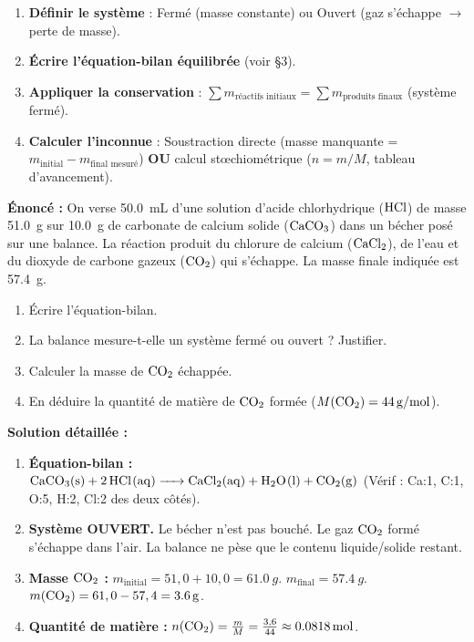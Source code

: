 \documentclass[11pt]{article}
\begin{document}
\begin{methode}
\begin{enumerate}
    \item \textbf{Définir le système} : Fermé (masse constante) ou Ouvert (gaz s'échappe $\rightarrow$ perte de masse).
    \item \textbf{Écrire l'équation-bilan équilibrée} (voir §3).
    \item \textbf{Appliquer la conservation} : $\sum m_{\text{réactifs initiaux}} = \sum m_{\text{produits finaux}}$ (système fermé).
    \item \textbf{Calculer l'inconnue} : Soustraction directe (masse manquante = $m_{\text{initial}} - m_{\text{final mesuré}}$) \textbf{OU} calcul stœchiométrique ($n = m/M$, tableau d'avancement).
\end{enumerate}
\end{methode}

\begin{exoresolu}
\textbf{Énoncé :} On verse \SI{50,0}{mL} d'une solution d'acide chlorhydrique ($\ce{HCl}$) de masse \SI{51,0}{g} sur \SI{10,0}{g} de carbonate de calcium solide ($\ce{CaCO3}$) dans un bécher posé sur une balance. La réaction produit du chlorure de calcium ($\ce{CaCl2}$), de l'eau et du dioxyde de carbone gazeux ($\ce{CO2}$) qui s'échappe. La masse finale indiquée est \SI{57,4}{g}.
\begin{enumerate}
    \item Écrire l'équation-bilan.
    \item La balance mesure-t-elle un système fermé ou ouvert ? Justifier.
    \item Calculer la masse de $\ce{CO2}$ échappée.
    \item En déduire la quantité de matière de $\ce{CO2}$ formée ($M(\ce{CO2})=\SI{44}{g/mol}$).
\end{enumerate}
\tcblower
\textbf{Solution détaillée :}
\begin{enumerate}
    \item \textbf{Équation-bilan :} $\ce{CaCO3(s) + 2 HCl(aq) -> CaCl2(aq) + H2O(l) + CO2(g)}$
    (Vérif : Ca:1, C:1, O:5, H:2, Cl:2 des deux côtés).
    \item \textbf{Système OUVERT.} Le bécher n'est pas bouché. Le gaz $\ce{CO2}$ formé s'échappe dans l'air. La balance ne pèse que le contenu liquide/solide restant.
    \item \textbf{Masse $\ce{CO2}$ :} $m_{\text{initial}} = 51,0 + 10,0 = \SI{61,0}{g}$. $m_{\text{final}} = \SI{57,4}{g}$.
    $m(\ce{CO2}) = 61,0 - 57,4 = \SI{3,6}{g}$.
    \item \textbf{Quantité de matière :} $n(\ce{CO2}) = \frac{m}{M} = \frac{3,6}{44} \approx \SI{0,0818}{mol}$.
\end{enumerate}
\end{exoresolu}
\end{document}

